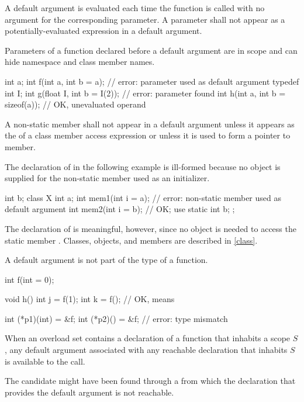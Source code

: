 \pnum
{}%
A default argument is evaluated each time the function is called
with no argument for the corresponding parameter.
%
A parameter shall not appear as a potentially-evaluated expression
in a default argument.
%
\begin{note}
Parameters of a function declared before a default argument
are in scope and can hide namespace and class member names.
\end{note}
\begin{example}
\begin{codeblock}
int a;
int f(int a, int b = a);            // error: parameter  used as default argument
typedef int I;
int g(float I, int b = I(2));       // error: parameter  found
int h(int a, int b = sizeof(a));    // OK, unevaluated operand
\end{codeblock}
\end{example}
A non-static member shall not appear in a default argument unless it appears as
the  of a class member access expression or
unless it is used to form a pointer to member.
\begin{example}
The declaration of
in the following example is ill-formed because no object is supplied for the
non-static member
used as an initializer.
\begin{codeblock}
int b;
class X {
  int a;
  int mem1(int i = a);              // error: non-static member  used as default argument
  int mem2(int i = b);              // OK;  use 
  static int b;
};
\end{codeblock}
The declaration of
is meaningful, however, since no object is needed to access the static member
.
Classes, objects, and members are described in \ref{class}.
\end{example}
A default argument is not part of the
type of a function.
\begin{example}
\begin{codeblock}
int f(int = 0);

void h() {
  int j = f(1);
  int k = f();                      // OK, means 
}

int (*p1)(int) = &f;
int (*p2)() = &f;                   // error: type mismatch
\end{codeblock}
\end{example}
When an overload set contains a declaration of a function
that inhabits a scope $S$,
any default argument associated with any reachable declaration that inhabits $S$
is available to the call.
\begin{note}
The candidate might have been found through a 
from which the declaration that provides the default argument is not reachable.
\end{note}

